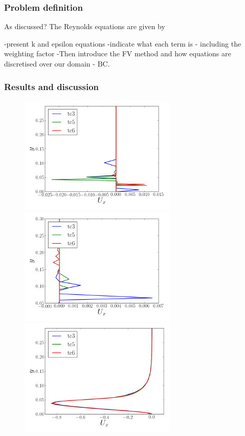 \documentclass[12pt,oneside,a4paper]{article}
\begin{document}
\subsubsection{Problem definition}
As discussed? The Reynolds equations are given by



-present k and epsilon equations
-indicate what each term is - including the weighting factor
-Then introduce the FV method and how equations are discretised over our domain - BC. 


\newpage

\subsubsection{Results and discussion}

\begin{figure}[!h]
\centering
\includegraphics[width=7.5cm]{images/CFD_meshIndependence/X1_Ux.png}\hfill \includegraphics[width=7.5cm]{images/CFD_meshIndependence/X2_Ux.png}\\
\includegraphics[width=7.5cm]{images/CFD_meshIndependence/X3_Ux.png}
\end{figure}
\end{document}
